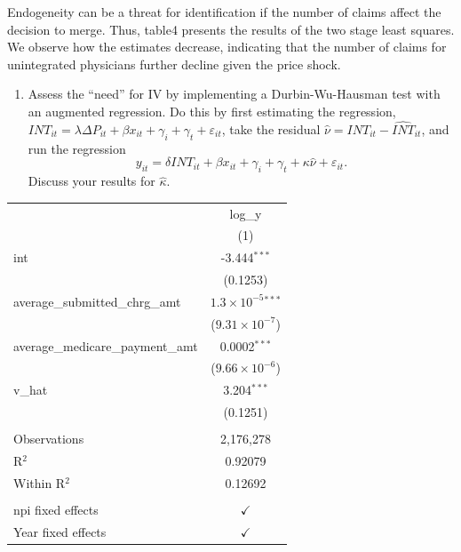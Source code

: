 \documentclass[
  12pt,
]{article}
\providecommand{\tightlist}{%
  \setlength{\itemsep}{0pt}\setlength{\parskip}{0pt}}
\begin{document}
Endogeneity can be a threat for identification if the number of claims
affect the decision to merge. Thus, table4 presents the results of the
two stage least squares. We observe how the estimates decrease,
indicating that the number of claims for unintegrated physicians further
decline given the price shock.

\begin{enumerate}
\def\labelenumi{\arabic{enumi}.}
\setcounter{enumi}{5}
\tightlist
\item
  Assess the ``need'' for IV by implementing a Durbin-Wu-Hausman test
  with an augmented regression. Do this by first estimating the
  regression,
  \(INT_{it} = \lambda \Delta P_{it} + \beta x_{it} + \gamma_{i} + \gamma_{t} + \varepsilon_{it}\),
  take the residual \(\hat{\nu} = INT_{it} - \hat{INT}_{it}\), and run
  the regression
  \[y_{it} = \delta INT_{it} + \beta x_{it} + \gamma_{i} + \gamma_{t} + \kappa \hat{\nu} + \varepsilon_{it}.\]
  Discuss your results for \(\hat{\kappa}\).
\end{enumerate}

\begingroup
\centering
\begin{tabular}{lc}
   \toprule
                                      & log\_y\\   
                                      & (1)\\  
   \midrule 
   int                                & -3.444$^{***}$\\   
                                      & (0.1253)\\   
   average\_submitted\_chrg\_amt      & $1.3\times 10^{-5}$$^{***}$\\    
                                      & ($9.31\times 10^{-7}$)\\    
   average\_medicare\_payment\_amt    & 0.0002$^{***}$\\   
                                      & ($9.66\times 10^{-6}$)\\    
   v\_hat                             & 3.204$^{***}$\\   
                                      & (0.1251)\\   
    \\
   Observations                       & 2,176,278\\  
   R$^2$                              & 0.92079\\  
   Within R$^2$                       & 0.12692\\  
    \\
   npi fixed effects                  & $\checkmark$\\   
   Year fixed effects                 & $\checkmark$\\   
   \bottomrule
\end{tabular}
\par\endgroup
\end{document}
